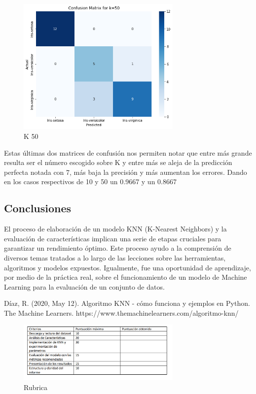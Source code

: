 \documentclass[conference]{IEEEtran}
\begin{document}
\begin{figure}[H]
  \includegraphics[width=80mm]{images/k50.png}
  \caption{K 50}\label{fig10}
\end{figure}
\FloatBarrier

Estas últimas dos matrices de confusión nos permiten notar que entre más grande resulta ser el número escogido sobre K y entre más se aleja de la predicción perfecta notada con 7, más baja la precisión y más aumentan los errores. Dando en los casos respectivos de 10 y 50 un 0.9667 y un 0.8667


\subsection{Conclusiones}
El proceso de elaboración de un modelo KNN (K-Nearest Neighbors) y la evaluación de características implican una serie de etapas cruciales para garantizar un rendimiento óptimo. Este proceso ayudo a la comprensión de diversos temas tratados a lo largo de las lecciones sobre las herramientas, algoritmos y modelos expuestos. Igualmente, fue una oportunidad de aprendizaje, por medio de la práctica real, sobre el funcionamiento de un modelo de Machine Learning para la evaluación de un conjunto de datos.


\begin{thebibliography}{00}
 Díaz, R. (2020, May 12). Algoritmo KNN - cómo funciona y ejemplos en Python. The Machine Learners. https://www.themachinelearners.com/algoritmo-knn/

\end{thebibliography}

\begin{figure}[ht]
  \includegraphics[width=80mm]{images/rubrica.png}
  \caption{Rubrica}\label{fig11}
\end{figure}
\FloatBarrier
\end{document}
